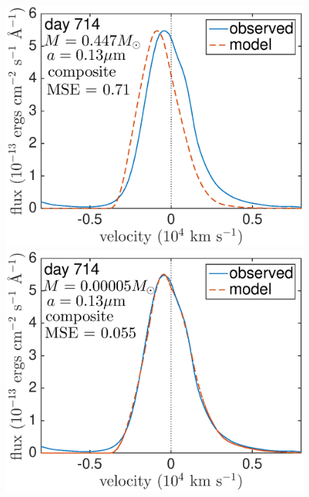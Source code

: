 \begin{figure}
\centering
\includegraphics[trim =16 30 20 0,clip=true,scale=0.35]{chapters/chapter5/images/silicates_take2/composite_Dwek_Ha2.eps}
\hspace{3mm}
\includegraphics[trim =0 30 0 -10,clip=true,scale=0.35]{chapters/chapter5/images/silicates_take2/composite_bestfit_Ha2.eps}


\end{figure}
